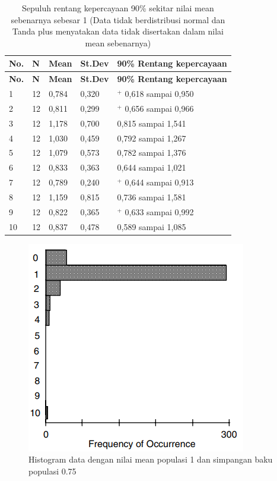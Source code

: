 \documentclass[]{book}
\begin{document}
\begin{longtable}[]{@{}lllll@{}}
\caption{\label{tab:iie2} Sepuluh rentang kepercayaan 90\% sekitar nilai
mean sebenarnya sebesar 1 (Data tidak berdistribusi normal dan Tanda
plus menyatakan data tidak disertakan dalam nilai mean
sebenarnya)}\tabularnewline
\toprule
\textbf{No.} & \textbf{N} & \textbf{Mean} & \textbf{St.Dev} &
\textbf{90\% Rentang kepercayaan}\tabularnewline
\midrule
\endfirsthead
\toprule
\textbf{No.} & \textbf{N} & \textbf{Mean} & \textbf{St.Dev} &
\textbf{90\% Rentang kepercayaan}\tabularnewline
\midrule
\endhead
1 & 12 & 0,784 & 0,320 & \(^+\) 0,618 sampai 0,950\tabularnewline
2 & 12 & 0,811 & 0,299 & \(^+\) 0,656 sampai 0,966\tabularnewline
3 & 12 & 1,178 & 0,700 & 0,815 sampai 1,541\tabularnewline
4 & 12 & 1,030 & 0,459 & 0,792 sampai 1,267\tabularnewline
5 & 12 & 1,079 & 0,573 & 0,782 sampai 1,376\tabularnewline
6 & 12 & 0,833 & 0,363 & 0,644 sampai 1,021\tabularnewline
7 & 12 & 0,789 & 0,240 & \(^+\) 0,644 sampai 0,913\tabularnewline
8 & 12 & 1,159 & 0,815 & 0,736 sampai 1,581\tabularnewline
9 & 12 & 0,822 & 0,365 & \(^+\) 0,633 sampai 0,992\tabularnewline
10 & 12 & 0,837 & 0,478 & 0,589 sampai 1,085\tabularnewline
\bottomrule
\end{longtable}

\begin{figure}

{\centering \includegraphics[width=0.7\linewidth]{iiedata} 

}

\caption{Histogram data dengan nilai mean populasi 1 dan simpangan baku populasi 0.75}\label{fig:iiedata}
\end{figure}
\end{document}
